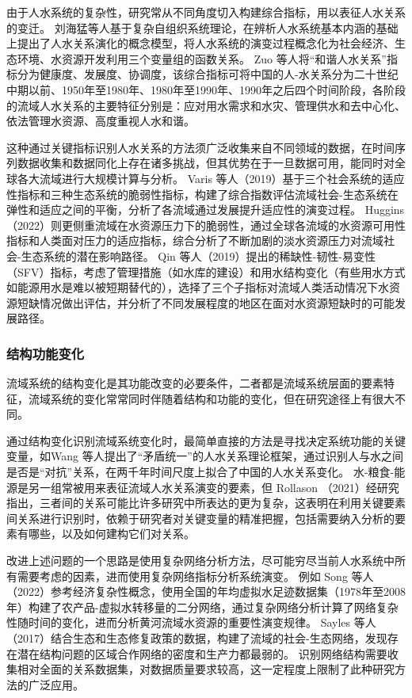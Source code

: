 由于人水系统的复杂性，研究常从不同角度切入构建综合指标，用以表征人水关系的变迁。
刘海猛等人基于复杂自组织系统理论，在辨析人水系统基本内涵的基础上提出了人水关系演化的概念模型，将人水系统的演变过程概念化为社会经济、生态环境、水资源开发利用三个变量组的函数关系\cite{liu2014}。
Zuo 等人将“和谐人水关系”指标分为健康度、发展度、协调度\cite{zuo2008}，该综合指标可将中国的人-水关系分为二十世纪中期以前、1950年至1980年、1980年至1990年、1990年之后四个时间阶段，各阶段的流域人水关系的主要特征分别是：应对用水需求和水灾、管理供水和去中心化、依法管理水资源、高度重视人水和谐\cite{zuo2016a}。

这种通过关键指标识别人水关系的方法须广泛收集来自不同领域的数据，在时间序列数据收集和数据同化上存在诸多挑战，但其优势在于一旦数据可用，能同时对全球各大流域进行大规模计算与分析。
Varis 等人（2019）基于三个社会系统的适应性指标和三种生态系统的脆弱性指标，构建了综合指数评估流域社会-生态系统在弹性和适应之间的平衡，分析了各流域通过发展提升适应性的演变过程\cite{varis2019}。
Huggins（2022）则更侧重流域在水资源压力下的脆弱性，通过全球各流域的水资源可用性指标和人类面对压力的适应指标，综合分析了不断加剧的淡水资源压力对流域社会-生态系统的潜在影响路径\cite{huggins2022}。
Qin 等人（2019）提出的稀缺性-韧性-易变性（SFV）指标，考虑了管理措施（如水库的建设）和用水结构变化（有些用水方式如能源用水是难以被短期替代的），选择了三个子指标对流域人类活动情况下水资源短缺情况做出评估，并分析了不同发展程度的地区在面对水资源短缺时的可能发展路径\cite{qin2019}。

\subsubsection*{结构功能变化}

流域系统的结构变化是其功能改变的必要条件，二者都是流域系统层面的要素特征，流域系统的变化常常同时伴随着结构和功能的变化，但在研究途径上有很大不同。

通过结构变化识别流域系统变化时，最简单直接的方法是寻找决定系统功能的关键变量，如Wang 等人提出了“矛盾统一”的人水关系理论框架，通过识别人与水之间是否是“对抗”关系，在两千年时间尺度上拟合了中国的人水关系变化\cite{wang2017}。
水-粮食-能源是另一组常被用来表征流域人水关系演变的要素，但 Rollason （2021）经研究指出，三者间的关系可能比许多研究中所表达的更为复杂\cite{rollason2021}，这表明在利用关键要素间关系进行识别时，依赖于研究者对关键变量的精准把握，包括需要纳入分析的要素有哪些，以及如何建构它们对关系。 %

改进上述问题的一个思路是使用复杂网络分析方法，尽可能穷尽当前人水系统中所有需要考虑的因素，进而使用复杂网络指标分析系统演变。 %
例如 Song 等人（2022）参考经济复杂性概念，使用全国的年均虚拟水足迹数据集（1978年至2008年）构建了农产品-虚拟水转移量的二分网络，通过复杂网络分析计算了网络复杂性随时间的变化，进而分析黄河流域水资源的重要性演变规律\cite{song2022}。
Sayles 等人（2017）结合生态和生态修复政策的数据，构建了流域的社会-生态网络，发现存在潜在结构问题的区域合作网络的密度和生产力都最弱的\cite{sayles2017}。
识别网络结构需要收集相对全面的关系数据集，对数据质量要求较高，这一定程度上限制了此种研究方法的广泛应用。

